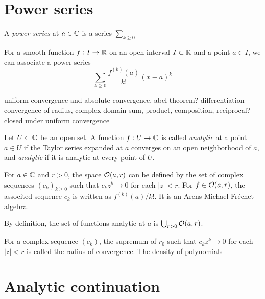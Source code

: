 \documentclass{../../large}
\begin{document}
\section{Power series}


\begin{prb}
A \emph{power series} at $a\in\mathbb{C}$ is a series $\sum_{k\ge0}$

For a smooth function $f:I\to\mathbb{R}$ on an open interval $I\subset\mathbb{R}$ and a point $a\in I$, we can associate a power series
\[\sum_{k\ge0}\frac{f^{(k)}(a)}{k!}(x-a)^k\]

\end{prb}

uniform convergence and absolute convergence, abel theorem?
differentiation
convergence of radius, complex domain
sum, product, composition, reciprocal?
closed under uniform convergence

\begin{prb}
Let $U\subset\mathbb{C}$ be an open set.
A function $f:U\to\mathbb{C}$ is called \emph{analytic} at a point $a\in U$ if the Taylor series expanded at $a$ converges  on an open neighborhood of $a$, and \emph{analytic} if it is analytic at every point of $U$.


For $a\in\mathbb{C}$ and $r>0$, the space $\mathcal{O}(a,r)$ can be defined by the set of complex sequences $(c_k)_{k\ge0}$ such that $c_kz^k\to0$ for each $|z|<r$.
For $f\in\mathcal{O}(a,r)$, the associted sequence $c_k$ is written as $f^{(k)}(a)/k!$.
It is an Arens-Michael Fr\'echet algebra.

By definition, the set of functions analytic at $a$ is $\bigcup_{r>0}\mathcal{O}(a,r)$.


For a complex sequence $(c_k)$, the supremum of $r_0$ such that $c_kz^k\to0$ for each $|z|<r$ is called the radius of convergence.
The density of polynomials
\end{prb}

\begin{prb}
\end{prb}

\begin{prb}
\end{prb}

\begin{prb}
\end{prb}


\section{Analytic continuation}
\end{document}

